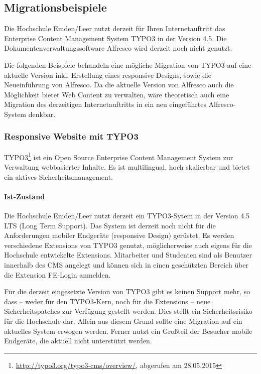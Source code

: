 \subsection{Migrationsbeispiele}
\label{subsection_migrationsbeispiele}

Die Hochschule Emden/Leer nutzt derzeit für Ihren Internetauftritt das Enterprise Content Management System TYPO3 in der Version 4.5. Die Dokumentenverwaltungssoftware Alfresco wird derzeit noch nicht genutzt. 

Die folgenden Beispiele behandeln eine mögliche Migration von TYPO3 auf eine aktuelle Version inkl. Erstellung eines responsive Designs, sowie die Neueinführung von Alfresco. Da die aktuelle Version von Alfresco auch die Möglichkeit bietet Web Content zu verwalten, wäre theoretisch auch eine Migration des derzeitigen Internetauftritts in ein neu eingeführtes Alfresco-System denkbar.

\subsubsection{Responsive Website mit TYPO3}
TYPO3\footnote{\url{http://typo3.org/typo3-cms/overview/}, abgerufen am 28.05.2015} ist ein Open Source Enterprise Content Management System zur Verwaltung webbasierter Inhalte. Es ist multilingual, hoch skalierbar und bietet ein aktives Sicherheitsmanagement.

\paragraph{Ist-Zustand}
Die Hochschule Emden/Leer nutzt derzeit ein TYPO3-Sytem in der Version 4.5 LTS (Long Term Support). Das System ist derzeit noch nicht für die Anforderungen mobiler Endgeräte (responsive Design) gerüstet. Es werden verschiedene Extensions von TYPO3 genutzt, möglicherweise auch eigens für die Hochschule entwickelte Extensions. Mitarbeiter und Studenten sind als Benutzer innerhalb des CMS angelegt und können sich in einen geschützten Bereich über die Extension FE-Login anmelden.

Für die derzeit eingesetzte Version von TYPO3 gibt es keinen Support mehr, so dass – weder für den TYPO3-Kern, noch für die Extensions – neue Sicherheitspatches zur Verfügung gestellt werden. Dies stellt ein Sicherheitsrisiko für die Hochschule dar. Allein aus diesem Grund sollte eine Migration auf ein aktuelles System erwogen werden. Ferner nutzt ein Großteil der Besucher mobile Endgeräte, die aktuell nicht unterstützt werden.

